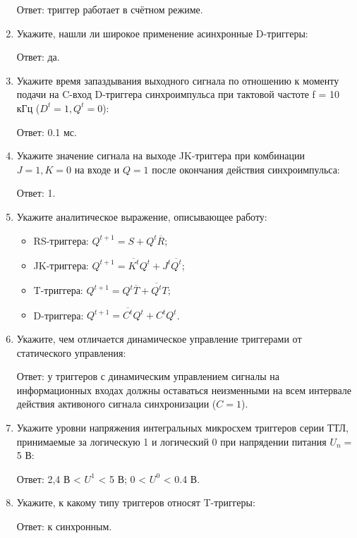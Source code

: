 \documentclass[spec, och, labwork]{shiza}
\begin{document}
\begin{enumerate}
        Ответ: триггер работает в счётном режиме.

    \item Укажите, нашли ли широкое применение асинхронные D-триггеры:
    
        Ответ: да.
    
    \item Укажите время запаздывания выходного сигнала по отношению к моменту подачи на C-вход D-триггера
    синхроимпульса при тактовой частоте f = 10 кГц ($D^t = 1, Q^t = 0$):

        Ответ: 0.1 мс.
    
    \item Укажите значение сигнала на выходе JK-триггера при комбинации $J = 1, K = 0$ на входе и $Q = 1$ после окончания действия синхроимпульса:

        Ответ: 1.
    
    \item Укажите аналитическое выражение, описывающее работу:
        
        \begin{itemize}
            \item RS-триггера: $Q^{t+1} = S + Q^t \overline{R}$;
            \item JK-триггера: $Q^{t+1} = \overline{K^t} Q^t + J^t \overline{Q^t}$;
            \item T-триггера: $Q^{t+1} = Q^t \overline{T} + \overline{Q^t} T$;
            \item D-триггера: $Q^{t+1} = \overline{C^t} Q^t + C^t Q^t$.
        \end{itemize}
    
    \item Укажите, чем отличается динамическое управление триггерами от статического управления:
    
        Ответ: у триггеров с динамическим управлением сигналы на информационных входах должны оставаться неизменными на всем интервале действия активоного сигнала синхронизации ($C = 1$).
    
    \item Укажите уровни напряжения интегральных микросхем триггеров серии ТТЛ, принимаемые за логическую 1 и логический 0 при напрядении питания $U_n = $ 5 В:

        Ответ: 2,4 В < $U^1$ < 5 В; 0 < $U^0$ < 0.4 В.

    \item Укажите, к какому типу триггеров относят T-триггеры:

        Ответ: к синхронным.

\end{enumerate}
\end{document}
